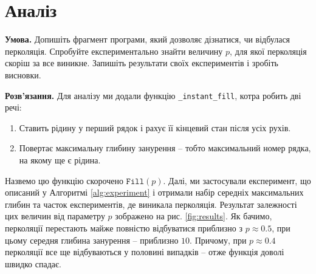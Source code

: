 \documentclass[14pt]{extarticle}
\begin{document}
\section{Аналіз}\label{section:problem_2}

\textbf{Умова.} Допишіть фрагмент програми, який дозволяє дізнатися, чи відбулася перколяція. Спробуйте експериментально знайти величину $p$, для якої перколяція скоріш за все виникне. Запишіть результати своїх експериментів і зробіть висновки.

\textbf{Розв'язання.} Для аналізу ми додали функцію \texttt{\_instant\_fill}, котра робить дві речі:
\begin{enumerate}
    \item Ставить рідину у перший рядок і рахує її кінцевий стан після усіх рухів.
    \item Повертає максимальну глибину занурення -- тобто максимальний номер рядка, на якому ще є рідина.
\end{enumerate}
Назвемо цю функцію скорочено $\texttt{Fill}(p)$. Далі, ми застосували експеримент, що описаний у Алгоритмі \ref{alg:experiment} і отримали набір середніх максимальних глибин та часток експериментів, де виникала перколяція. Результат залежності цих величин від параметру $p$ зображено на рис. \ref{fig:results}. Як бачимо, перколяції перестають майже повністю відбуватися приблизно з $p \approx 0.5$, при цьому середня глибина занурення -- приблизно $10$. Причому, при $p \approx 0.4$ перколяції все ще відбуваються у половині випадків -- отже функція доволі швидко спадає. 
\end{document}
